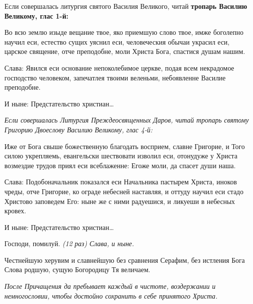 \itshape 


Если совершалась литургия святого Василия Великого, читай\normalfont{} \bfseries тропарь Василию Великому, глас 1-й:\normalfont{}


Во всю землю изыде вещание твое, яко приемшую слово твое, имже боголепно научил еси, естество сущих уяснил еси, человеческия обычаи украсил еси, царское священие, отче преподобне, моли Христа Бога, спастися душам нашим.




Слава: Явился еси основание непоколебимое церкве, подая всем некрадомое господство человеком, запечатлея твоими веленьми, небоявленне Василие преподобне.

И ныне: Предстательство христиан…


\itshape Если совершалась Литургия Преждеосвященных Даров, читай тропарь святому Григорию Двоеслову Василию  Великому, глас 4-й:\normalfont{}

Иже от Бога свыше божественную благодать восприем, славне Григорие, и Того силою укрепляемь, евангельски шествовати изволил еси, отонудуже у Христа возмездие трудов приял еси всеблаженне: Егоже моли, да спасет души наша.  



Слава: Подобоначальник показался еси Начальника пастырем Христа, иноков чреды, отче Григорие, ко ограде небесней наставляя, и оттуду научил еси стадо Христово заповедем Его: ныне же с ними радуешися, и ликуеши в небесных кровех.


И ныне: Предстательство христиан…


Господи, помилуй. \itshape (12 раз)\normalfont{} Слава, и ныне.


Честнейшую херувим и славнейшую без сравнения Серафим, без истления Бога Слова родшую, сущую Богородицу Тя величаем.

\itshape После Причащения да пребывает каждый в чистоте, воздержании и немногословии, чтобы достойно сохранить в себе принятого Христа.\normalfont{}\mychapterending
